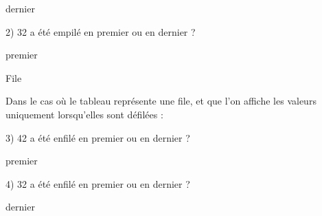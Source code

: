 \documentclass[11pt,a4paper]{article}
\begin{document}
\begin{center}
\begin{table}[ht!]
\begin{minipage}{0.45\textwidth}
\bigskip
dernier
\bigskip

2) 32 a été empilé en premier ou en dernier ?

\bigskip
premier
\bigskip

  \end{minipage}
  \hfillx
  \begin{minipage}{0.01\textwidth}


  \end{minipage}
  \hfillx
  \begin{minipage}{0.45\textwidth}
    \centering
File

Dans le cas où le tableau représente une file, et que l'on affiche les valeurs uniquement lorsqu'elles sont défilées :

\smallskip

\raggedright
3) 42 a été enfilé en premier ou en dernier ?

\bigskip
premier
\bigskip

4) 32 a été enfilé en premier ou en dernier ?

\bigskip
dernier
\bigskip

  \end{minipage}
\end{table}

\end{center}

\vspace*{-1.5cm}
\end{document}
